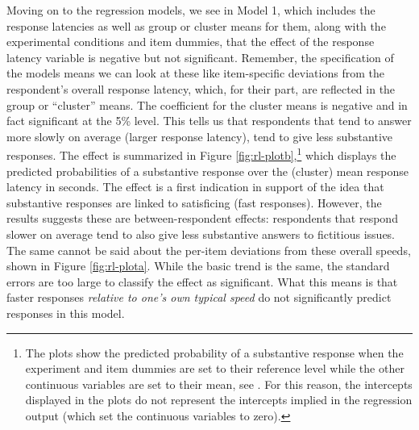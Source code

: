 \documentclass[Royal,times,sageh]{sagej}
\begin{document}
Moving on to the regression models, we see in Model 1, which includes
the response latencies as well as group or cluster means for them, along
with the experimental conditions and item dummies, that the effect of
the response latency variable is negative but not significant. Remember,
the specification of the models means we can look at these like
item-specific deviations from the respondent's overall response latency,
which, for their part, are reflected in the group or ``cluster'' means.
The coefficient for the cluster means is negative and in fact
significant at the 5\% level. This tells us that respondents that tend
to answer more slowly on average (larger response latency), tend to give
less substantive responses. The effect is summarized in Figure
\ref{fig:rl-plotb},\footnote{The plots show the predicted probability of
  a substantive response when the experiment and item dummies are set to
  their reference level while the other continuous variables are set to
  their mean, see \citet{Luedecke2021}. For this reason, the intercepts
  displayed in the plots do not represent the intercepts implied in the
  regression output (which set the continuous variables to zero).} which
displays the predicted probabilities of a substantive response over the
(cluster) mean response latency in seconds. The effect is a first
indication in support of the idea that substantive responses are linked
to satisficing (fast responses). However, the results suggests these are
between-respondent effects: respondents that respond slower on average
tend to also give less substantive answers to fictitious issues. The
same cannot be said about the per-item deviations from these overall
speeds, shown in Figure \ref{fig:rl-plota}. While the basic trend is the
same, the standard errors are too large to classify the effect as
significant. What this means is that faster responses
\textit{relative to one's own typical speed} do not significantly
predict responses in this model.
\end{document}

